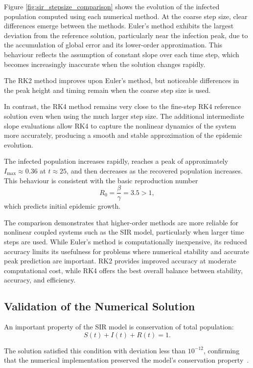 \documentclass{article}
\begin{document}
Figure \ref{fig:sir_stepsize_comparison} shows the evolution of the infected population computed using each numerical method. At the coarse step size, clear differences emerge between the methods. Euler’s method exhibits the largest deviation from the reference solution, particularly near the infection peak, due to the accumulation of global error and its lower-order approximation. This behaviour reflects the assumption of constant slope over each time step, which becomes increasingly inaccurate when the solution changes rapidly.

The RK2 method improves upon Euler's method, but noticeable differences in the peak height and timing remain when the coarse step size is used.

In contrast, the RK4 method remains very close to the fine-step RK4 reference solution even when using the much larger step size. The additional intermediate slope evaluations allow RK4 to capture the nonlinear dynamics of the system more accurately, producing a smooth and stable approximation of the epidemic evolution.

The infected population increases rapidly, reaches a peak of approximately $I_{\max} \approx 0.36$ at $t \approx 25$, and then decreases as the recovered population increases. This behaviour is consistent with the basic reproduction number
\[
R_0 = \frac{\beta}{\gamma} = 3.5 > 1,
\]
which predicts initial epidemic growth.

The comparison demonstrates that higher-order methods are more reliable for nonlinear coupled systems such as the SIR model, particularly when larger time steps are used. While Euler’s method is computationally inexpensive, its reduced accuracy limits its usefulness for problems where numerical stability and accurate peak prediction are important. RK2 provides improved accuracy at moderate computational cost, while RK4 offers the best overall balance between stability, accuracy, and efficiency.

\subsection{Validation of the Numerical Solution}

An important property of the SIR model is conservation of total population:
\[
S(t) + I(t) + R(t) = 1.
\]

The solution satisfied this condition with deviation less than $10^{-12}$, confirming that the numerical implementation preserved the model's conservation property~\cite{6}.
\end{document}
